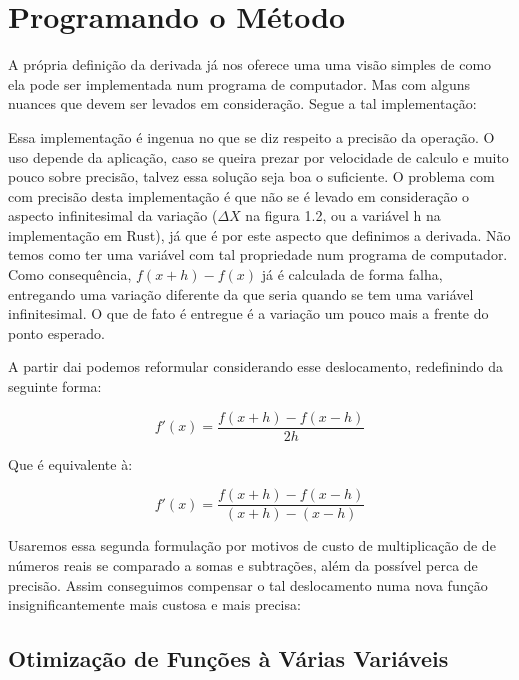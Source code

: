 \section{{Programando o Método}}

\hspace{0.8cm}


A própria definição da derivada já nos oferece uma uma visão simples de como
ela pode ser implementada num programa de computador. Mas com alguns nuances
que devem ser levados em consideração. Segue a tal implementação:



Essa implementação é ingenua no que se diz respeito a precisão da operação. O
uso depende da aplicação, caso se queira prezar por velocidade de calculo e 
muito pouco sobre precisão, talvez essa solução seja boa o suficiente. O
problema com com precisão desta implementação é que não se é levado em
consideração o aspecto infinitesimal da variação (\(\Delta X\) na figura 1.2, ou
a variável h na implementação em Rust), já que é por este aspecto que
definimos a derivada. Não temos como ter uma variável com tal propriedade num
programa de computador. Como consequência, \(f(x + h) - f(x)\) já é calculada
de forma falha, entregando uma variação diferente da que seria quando se tem
uma variável infinitesimal. O que de fato é entregue é a variação um pouco mais
a frente do ponto esperado.

A partir dai podemos reformular considerando esse deslocamento, redefinindo
da seguinte forma:


\begin{equation}
    f'(x) = \frac{f(x + h) - f(x - h)}{2h}
\end{equation}

Que é equivalente à:

\begin{equation}
    f'(x) = \frac{f(x + h) - f(x - h)}{(x + h) - (x - h)}
\end{equation}


Usaremos essa segunda formulação por motivos de custo de multiplicação de de
números reais se comparado a somas e subtrações, além da possível perca de
precisão. Assim conseguimos compensar o tal deslocamento numa nova função
insignificantemente mais custosa e mais precisa:








\textcolor[rgb]{1,0,0}{\section{{Otimização de Funções à Várias Variáveis}}}

\hspace{0.8cm}





%
